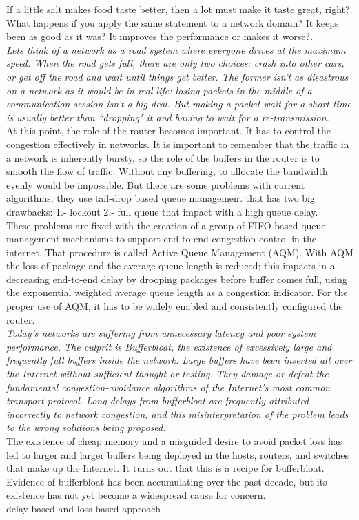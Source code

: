 If a little salt makes food taste better, then a lot must make it taste great, right?. What happens if you apply the same statement to a network domain? It keeps been as good as it was? It improves the performance or makes it worse?.\\

\textit{Lets think of a network as a road system where everyone drives at the maximum speed. When the road gets full, there are only two choices: crash into other cars, or get off the road and wait until things get better. The former isn't as disastrous on a network as it would be in real life: losing packets in the middle of a communication session isn't a big deal. But making a packet wait for a short time is usually better than ``dropping" it and having to wait for a re-transmission.}\cite{bufferarms}\\

At this point, the role of the router becomes important. It has to control the congestion effectively in networks. It is important to remember that the traffic in a network is inherently bursty, so the role of the buffers in the router is to smooth the flow of traffic. Without any buffering, to allocate the bandwidth evenly would be impossible. But there are some problems with current algorithms; they use tail-drop based queue management that has two big drawbacks: 1.- lockout 2.- full queue that impact with a high queue delay.\\

These problems are fixed with the creation of a group of FIFO based queue management mechanisms to support end-to-end congestion control in the internet. That procedure is called Active Queue Management (AQM). With AQM the loss of package and the average queue length is reduced; this impacts in a decreasing end-to-end delay by drooping packages before buffer comes full, using the exponential weighted average queue length as a congestion indicator. For the proper use of AQM, it has to be widely enabled and consistently configured the router.\\

\textit{Today's networks are suffering from unnecessary latency and poor system performance. The culprit is Bufferbloat, the existence of excessively large and frequently full buffers inside the network. Large buffers have been inserted all over the Internet without sufficient thought or testing. They damage or defeat the fundamental congestion-avoidance algorithms of the Internet's most common transport protocol. Long delays from bufferbloat are frequently attributed incorrectly to network congestion, and this misinterpretation of the problem leads to the wrong solutions being proposed.}\cite{GettysNichols}\\

The existence of cheap memory and a misguided desire to avoid packet loss has led to larger and larger buffers being deployed in the hosts, routers, and switches that make up the Internet. It turns out that this is a recipe for bufferbloat. Evidence of bufferbloat has been accumulating over the past decade, but its existence has not yet become a widespread cause for concern.\\


delay-based and loss-based approach

